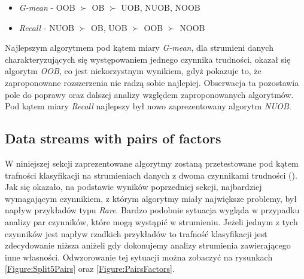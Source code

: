 \begin{itemize}
    \item \textit{G-mean} - OOB $\succ$ OB $\succ$ UOB, NUOB, NOOB
    \item \textit{Recall} - NUOB $\succ$ OB, UOB $\succ$ OOB $\succ$ NOOB
\end{itemize}

\noindent Najlepszym algorytmem pod kątem miary \textit{G-mean}, dla strumieni danych charakteryzujących się występowaniem jednego czynnika trudności, okazał się algorytm \textit{OOB}, co jest niekorzystnym wynikiem, gdyż pokazuje to, że zaproponowane rozszerzenia nie radzą sobie najlepiej. Obserwacja ta pozostawia pole do poprawy oraz dalszej analizy względem zaproponowanych algorytmów. Pod kątem miary \textit{Recall} najlepszy był nowo zaprezentowany algorytm \textit{NUOB}.

\subsection{Data streams with pairs of factors}

\noindent W niniejszej sekcji zaprezentowane algorytmy zostaną przetestowane pod kątem trafności klasyfikacji na strumieniach danych z dwoma czynnikami trudności (). Jak się okazało, na podstawie wyników poprzedniej sekcji, najbardziej wymagającym czynnikiem, z którym algorytmy miały największe problemy, był napływ przykładów typu \textit{Rare}. Bardzo podobnie sytuacja wygląda w przypadku analizy par czynników, które mogą wystąpić w strumieniu. Jeżeli jednym z tych czynników jest napływ rzadkich przykładów to trafność klasyfikacji jest zdecydowanie niższa aniżeli gdy dokonujemy analizy strumienia zawierającego inne własności. Odwzorowanie tej sytuacji można zobaczyć na rysunkach \ref{Figure:Split5Pairs} oraz \ref{Figure:PairsFactors}.

